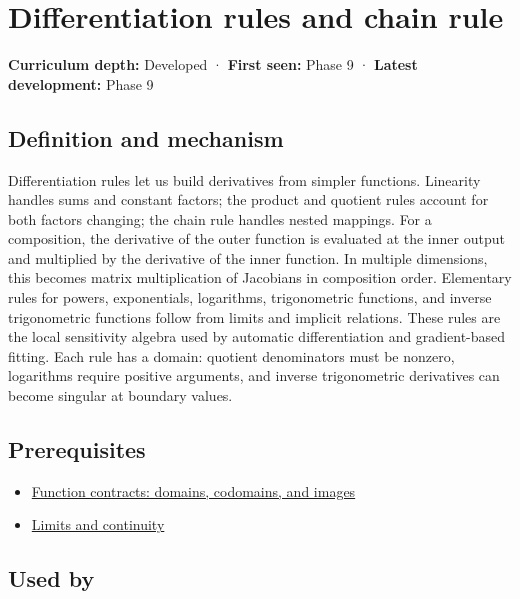 \hypertarget{appendix-d9f70bdfbc92}{}
\section{Differentiation rules and chain rule}\label{appendix-d9f70bdfbc92-differentiation-rules-and-chain-rule}

\textbf{Curriculum depth:} Developed · \textbf{First seen:} Phase 9 · \textbf{Latest development:} Phase 9

\subsection{Definition and mechanism}\label{appendix-d9f70bdfbc92-definition-and-mechanism}

Differentiation rules let us build derivatives from simpler functions. Linearity handles sums and constant factors; the product and quotient rules account for both factors changing; the chain rule handles nested mappings. For a composition, the derivative of the outer function is evaluated at the inner output and multiplied by the derivative of the inner function. In multiple dimensions, this becomes matrix multiplication of Jacobians in composition order. Elementary rules for powers, exponentials, logarithms, trigonometric functions, and inverse trigonometric functions follow from limits and implicit relations. These rules are the local sensitivity algebra used by automatic differentiation and gradient-based fitting. Each rule has a domain: quotient denominators must be nonzero, logarithms require positive arguments, and inverse trigonometric derivatives can become singular at boundary values.

\subsection{Prerequisites}\label{appendix-d9f70bdfbc92-prerequisites}

\begin{itemize}
\tightlist
\item
  \hyperref[appendix-a59658325cd6]{Function contracts: domains, codomains, and images}
\item
  \hyperref[appendix-fecc1847f5a3]{Limits and continuity}
\end{itemize}

\subsection{Used by}\label{appendix-d9f70bdfbc92-used-by}

